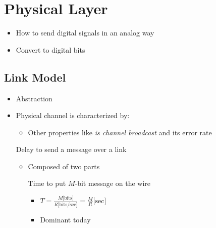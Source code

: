 
\section{Physical Layer}
\begin{itemize}
    \item How to send digital signals in an analog way
    \item Convert to digital bits
\end{itemize}

\subsection{Link Model}
\begin{itemize}
    \item Abstraction
    \item Physical channel is characterized by:
        \begin{itemize}
             in bps
                \begin{itemize}
                    \item Also called \textbf{bandwidth}, \textbf{capacity} or \textbf{speed}
                \end{itemize}
             in seconds
                \begin{itemize}
                    \item Depends on message length and media length
                    \item Also called \textbf{latency}
                \end{itemize}
            \item Other properties like \textit{is channel broadcast} and its error rate
        \end{itemize}
     Delay to send a message over a link
        \begin{itemize}
            \item Composed of two parts
                \begin{itemize}
                     Time to put $M$-bit message on the wire \begin{itemize}
                            \item $T = \frac{M \text{[bits]}}{R \text{[bits/sec]}} = \frac{M}{R} \text{[sec]}$
                            \item Dominant today
                        \end{itemize}

\end{itemize}
\end{itemize}
\end{itemize}

